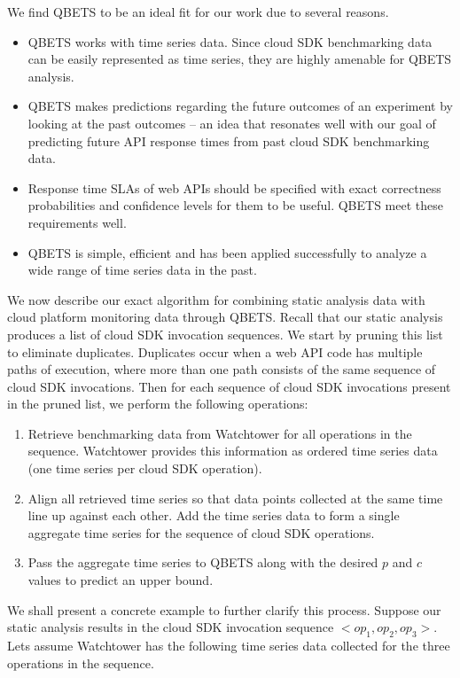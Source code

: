 We find QBETS to be an ideal fit for our work due to several reasons. 
\begin{itemize}
\item QBETS works with time series data. Since
cloud SDK benchmarking data can be easily represented as time series,
they are highly amenable for QBETS analysis. 
\item QBETS makes predictions regarding the
future outcomes of an experiment by looking at the past outcomes -- an idea that resonates well with our
goal of predicting future API response times from past cloud SDK benchmarking data. 
\item Response time
SLAs of web APIs should be specified with exact correctness probabilities and confidence levels for
them to be useful. QBETS meet these requirements well. 
\item QBETS is 
simple, efficient and has been applied successfully to analyze a wide range of time series data in the past.
\end{itemize}

We now describe our exact algorithm for combining static analysis data with cloud platform monitoring 
data through QBETS. Recall that our static analysis produces a list of cloud SDK invocation sequences.
We start by pruning this list to eliminate duplicates. Duplicates occur when a web API code has
multiple paths of execution, where more than one path consists of the same sequence of cloud 
SDK invocations. Then for each sequence of cloud SDK invocations present in the pruned list, we
perform the following operations:

\begin{enumerate}
\item Retrieve benchmarking data from Watchtower for all operations in the sequence. Watchtower provides
this information as ordered time series data (one time series per cloud SDK operation).
\item Align all retrieved time series so that data points collected at the same time line up against each other.
Add the time series data to form a single aggregate time series for the sequence of cloud SDK operations.
\item Pass the aggregate time series to QBETS along with the desired $p$ and $c$ values to predict an
upper bound. 
\end{enumerate}

We shall present a concrete example to further clarify this process. Suppose our static analysis results in the
cloud SDK invocation sequence $<op_{1},op_{2},op_{3}>$. Lets assume Watchtower has the following
time series data collected for the three operations in the sequence.

